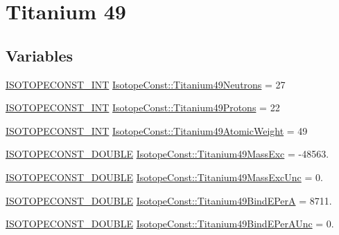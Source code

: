 \hypertarget{group___isotope_const-_titanium-_ti49}{}\section{Titanium 49}
\label{group___isotope_const-_titanium-_ti49}
\subsection*{Variables}
\begin{DoxyCompactItemize}
\item 
\mbox{\hyperlink{group___isotope_const-_macros_ga5f18360b3e99483a35c32d789e62621c}{I\+S\+O\+T\+O\+P\+E\+C\+O\+N\+S\+T\+\_\+\+I\+NT}} \mbox{\hyperlink{group___isotope_const-_titanium-_ti49_gaa5d3fd3942fdf97f1e6c7d7897424cc6}{Isotope\+Const\+::\+Titanium49\+Neutrons}} = 27
\item 
\mbox{\hyperlink{group___isotope_const-_macros_ga5f18360b3e99483a35c32d789e62621c}{I\+S\+O\+T\+O\+P\+E\+C\+O\+N\+S\+T\+\_\+\+I\+NT}} \mbox{\hyperlink{group___isotope_const-_titanium-_ti49_gaff33e3cc8e8e28c358c19a158656808d}{Isotope\+Const\+::\+Titanium49\+Protons}} = 22
\item 
\mbox{\hyperlink{group___isotope_const-_macros_ga5f18360b3e99483a35c32d789e62621c}{I\+S\+O\+T\+O\+P\+E\+C\+O\+N\+S\+T\+\_\+\+I\+NT}} \mbox{\hyperlink{group___isotope_const-_titanium-_ti49_ga6c0b329cbf7e6799adb06ca43f2c9607}{Isotope\+Const\+::\+Titanium49\+Atomic\+Weight}} = 49
\item 
\mbox{\hyperlink{group___isotope_const-_macros_ga8f45a7272ce02c0b4c65c44636ed719a}{I\+S\+O\+T\+O\+P\+E\+C\+O\+N\+S\+T\+\_\+\+D\+O\+U\+B\+LE}} \mbox{\hyperlink{group___isotope_const-_titanium-_ti49_ga19227ad128d89ba303ec71ba2248477a}{Isotope\+Const\+::\+Titanium49\+Mass\+Exc}} = -\/48563.
\item 
\mbox{\hyperlink{group___isotope_const-_macros_ga8f45a7272ce02c0b4c65c44636ed719a}{I\+S\+O\+T\+O\+P\+E\+C\+O\+N\+S\+T\+\_\+\+D\+O\+U\+B\+LE}} \mbox{\hyperlink{group___isotope_const-_titanium-_ti49_ga8b5d31dfc1c86f38222a2035b1376bbf}{Isotope\+Const\+::\+Titanium49\+Mass\+Exc\+Unc}} = 0.
\item 
\mbox{\hyperlink{group___isotope_const-_macros_ga8f45a7272ce02c0b4c65c44636ed719a}{I\+S\+O\+T\+O\+P\+E\+C\+O\+N\+S\+T\+\_\+\+D\+O\+U\+B\+LE}} \mbox{\hyperlink{group___isotope_const-_titanium-_ti49_ga4cdc830832c489249e4331b19194ec5c}{Isotope\+Const\+::\+Titanium49\+Bind\+E\+PerA}} = 8711.
\item 
\mbox{\hyperlink{group___isotope_const-_macros_ga8f45a7272ce02c0b4c65c44636ed719a}{I\+S\+O\+T\+O\+P\+E\+C\+O\+N\+S\+T\+\_\+\+D\+O\+U\+B\+LE}} \mbox{\hyperlink{group___isotope_const-_titanium-_ti49_gab862b58c00950dffca5cd6fa8a36c5e7}{Isotope\+Const\+::\+Titanium49\+Bind\+E\+Per\+A\+Unc}} = 0.

\end{DoxyCompactItemize}

